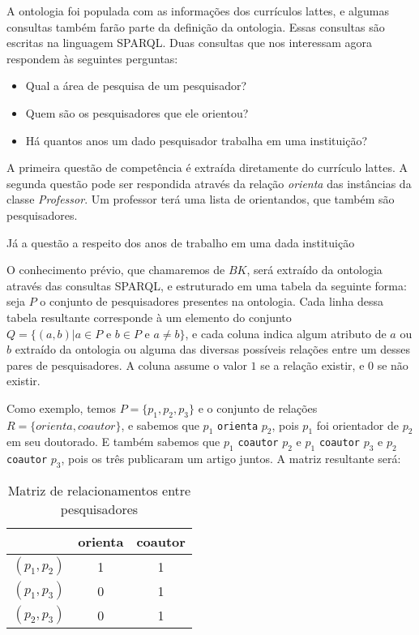 A ontologia foi populada com as informações dos currículos lattes, e algumas consultas também farão parte da definição da ontologia. Essas consultas são escritas na linguagem SPARQL. Duas consultas que nos interessam agora respondem às seguintes perguntas:

\begin{itemize}
    \item Qual a área de pesquisa de um pesquisador?
    \item Quem são os pesquisadores que ele orientou?
    \item Há quantos anos um dado pesquisador trabalha em uma instituição?
\end{itemize}

A primeira questão de competência é extraída diretamente do currículo lattes. A segunda questão pode ser respondida através da relação \textit{orienta} das instâncias da classe \textit{Professor}. Um professor terá uma lista de orientandos, que também são pesquisadores.

Já a questão a respeito dos anos de trabalho em uma dada instituição


O conhecimento prévio, que chamaremos de $BK$, será extraído da ontologia através das consultas SPARQL, e estruturado em uma tabela da seguinte forma: seja $P$ o conjunto de pesquisadores presentes na ontologia. Cada linha dessa tabela resultante corresponde à um elemento do conjunto $Q = \{ (a, b) | a \in P \text{ e } b \in P \text{ e } a \neq b \}$, e cada coluna indica algum atributo de $a$ ou $b$ extraído da ontologia ou alguma das diversas possíveis relações entre um desses pares de pesquisadores. A coluna assume o valor $1$ se a relação existir, e $0$ se não existir.

Como exemplo, temos $P = \{ p_1, p_2, p_3 \}$ e o conjunto de relações $R = \{ orienta, coautor \}$, e sabemos que $p_1$ \texttt{orienta} $p_2$, pois $p_1$ foi orientador de $p_2$ em seu doutorado. E também sabemos que $p_1$ \texttt{coautor} $p_2$ e $p_1$ \texttt{coautor} $p_3$ e $p_2$ \texttt{coautor} $p_3$, pois os três publicaram um artigo juntos. A matriz resultante será:

\begin{table}[h!]
    \centering
    \begin{tabular}{|c|c|c|}
     \hline
      & orienta & coautor \\
     \hline\hline
     $(p_1, p_2)$ & 1 & 1  \\
     \hline
     $(p_1, p_3)$ & 0 & 1  \\
     \hline
     $(p_2, p_3)$ & 0 & 1  \\
     \hline
    \end{tabular}
    \caption{Matriz de relacionamentos entre pesquisadores}
    \label{matriz-relacoes}
\end{table}

